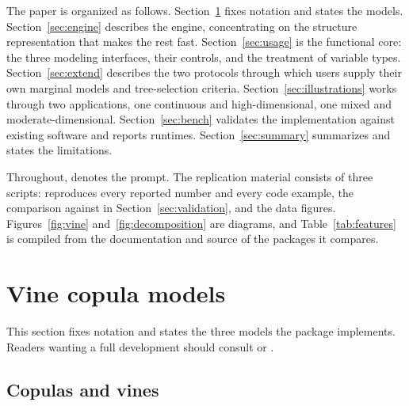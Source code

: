 \documentclass[article]{jss}
\begin{document}
The paper is organized as follows.  Section~\ref{sec:models} fixes notation and
states the models.  Section~\ref{sec:engine} describes the 
engine, concentrating on the structure representation that makes the rest fast.
Section~\ref{sec:usage} is the functional core: the three modeling interfaces,
their controls, and the treatment of variable types.  Section~\ref{sec:extend}
describes the two protocols through which users supply their own marginal
models and tree-selection criteria.  Section~\ref{sec:illustrations} works
through two applications, one continuous and high-dimensional, one mixed and
moderate-dimensional.  Section~\ref{sec:bench} validates the implementation
against existing software and reports runtimes.  Section~\ref{sec:summary}
summarizes and states the limitations.

Throughout,  denotes the  prompt.  The replication
material consists of three scripts:  reproduces every reported
number and every code example,  the comparison against
 in Section~\ref{sec:validation}, and 
the data figures.  Figures~\ref{fig:vine} and~\ref{fig:decomposition} are
diagrams, and Table~\ref{tab:features} is compiled from the documentation and
source of the packages it compares.

\section{Vine copula models}\label{sec:models}

This section fixes notation and states the three models the package
implements.  Readers wanting a full development should consult
\citet{czado2019} or \citet{joe2014}.

\subsection{Copulas and vines}\label{sec:pcc}
\end{document}
